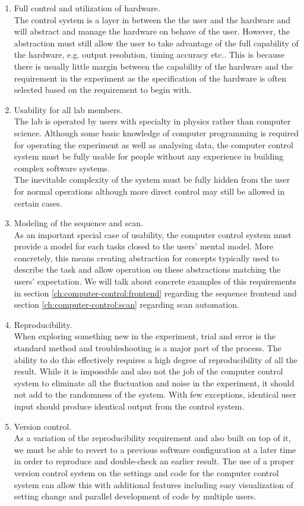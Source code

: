 \begin{enumerate}
\item Full control and utilization of hardware.\\
  The control system is a layer in between the the user and the hardware
  and will abstract and manage the hardware on behave of the user.
  However, the abstraction must still allow the user to take advantage of
  the full capability of the hardware, e.g. output resolution, timing accuracy etc..
  This is because there is usually little margin between the capability of the hardware
  and the requirement in the experiment as the specification of the hardware
  is often selected based on the requirement to begin with.
\item Usability for all lab members.\\
  The lab is operated by users with specialty in physics rather than computer science.
  Although some basic knowledge of computer programming is required for operating
  the experiment as well as analysing data,
  the computer control system must be fully usable for people without any experience
  in building complex software systems.\\
  The inevitable complexity of the system must be fully hidden from the user
  for normal operations although more direct control may still be allowed in certain cases.
\item Modeling of the sequence and scan.\\
  As an important special case of usability,
  the computer control system must provide a model for each tasks closed to
  the users' mental model.
  More concretely, this means creating abstraction for concepts
  typically used to describe the task and allow operation on these abstractions
  matching the users' expectation.
  We will talk about concrete examples of this requirements
  in section \ref{ch:computer-control:frontend} regarding the sequence frontend
  and section \ref{ch:computer-control:scan} regarding scan automation.
\item Reproducibility.\\
  When exploring something new in the experiment,
  trial and error is the standard method and troubleshooting is a major part of the process.
  The ability to do this effectively requires a high degree of reproducibility of all the result.
  While it is impossible and also not the job of the computer control system to
  eliminate all the fluctuation and noise in the experiment,
  it should not add to the randomness of the system.
  With few exceptions, identical user input should produce identical output from
  the control system.
\item Version control.\\
  As a variation of the reproducibility requirement and also built on top of it,
  we must be able to revert to a previous software configuration at a later time
  in order to reproduce and double-check an earlier result.
  The use of a proper version control system on the settings and code for
  the computer control system can allow this with additional features
  including easy visualization of setting change and parallel development of code
  by multiple users.
\end{enumerate}


